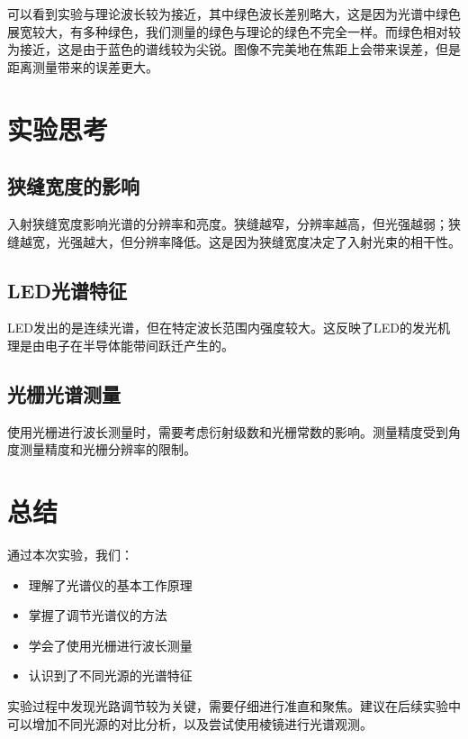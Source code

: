 \documentclass{ctexart}
\begin{document}
可以看到实验与理论波长较为接近，其中绿色波长差别略大，这是因为光谱中绿色展宽较大，有多种绿色，我们测量的绿色与理论的绿色不完全一样。而绿色相对较为接近，这是由于蓝色的谱线较为尖锐。图像不完美地在焦距上会带来误差，但是距离测量带来的误差更大。
\section{实验思考}

\subsection{狭缝宽度的影响}
入射狭缝宽度影响光谱的分辨率和亮度。狭缝越窄，分辨率越高，但光强越弱；狭缝越宽，光强越大，但分辨率降低。这是因为狭缝宽度决定了入射光束的相干性。

\subsection{LED光谱特征}
LED发出的是连续光谱，但在特定波长范围内强度较大。这反映了LED的发光机理是由电子在半导体能带间跃迁产生的。

\subsection{光栅光谱测量}
使用光栅进行波长测量时，需要考虑衍射级数和光栅常数的影响。测量精度受到角度测量精度和光栅分辨率的限制。

\section{总结}

通过本次实验，我们：
\begin{itemize}
    \item 理解了光谱仪的基本工作原理
    \item 掌握了调节光谱仪的方法
    \item 学会了使用光栅进行波长测量
    \item 认识到了不同光源的光谱特征
\end{itemize}

实验过程中发现光路调节较为关键，需要仔细进行准直和聚焦。建议在后续实验中可以增加不同光源的对比分析，以及尝试使用棱镜进行光谱观测。
\end{document}
